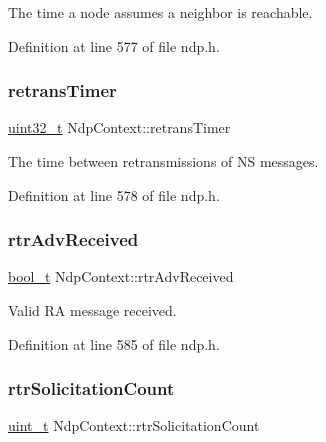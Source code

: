 The time a node assumes a neighbor is reachable. 



Definition at line 577 of file ndp.\+h.

\mbox{\label{structNdpContext_a529caf9017efd6a9e5b9e546a9a0c012}} 
\subsubsection{\texorpdfstring{retrans\+Timer}{retransTimer}}
{\footnotesize\ttfamily \hyperlink{stdint_8h_a435d1572bf3f880d55459d9805097f62}{uint32\+\_\+t} Ndp\+Context\+::retrans\+Timer}



The time between retransmissions of NS messages. 



Definition at line 578 of file ndp.\+h.

\mbox{\label{structNdpContext_af16d6cf8472c6b3827ba500f25458579}} 
\subsubsection{\texorpdfstring{rtr\+Adv\+Received}{rtrAdvReceived}}
{\footnotesize\ttfamily \hyperlink{compiler__port_8h_a812d16e5494522586b3784e55d479912}{bool\+\_\+t} Ndp\+Context\+::rtr\+Adv\+Received}



Valid RA message received. 



Definition at line 585 of file ndp.\+h.

\mbox{\label{structNdpContext_aa6eac8a31ad5f605018412cbdc75fbee}} 
\subsubsection{\texorpdfstring{rtr\+Solicitation\+Count}{rtrSolicitationCount}}
{\footnotesize\ttfamily \hyperlink{compiler__port_8h_a12a1e9b3ce141648783a82445d02b58d}{uint\+\_\+t} Ndp\+Context\+::rtr\+Solicitation\+Count}



